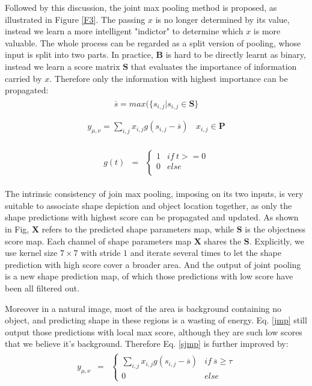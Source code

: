 \documentclass[10pt,twocolumn,letterpaper]{article}
\begin{document}
Followed by this discussion, the joint max pooling method is proposed, as illustrated in Figure \ref{F3}.
The passing $x$ is no longer determined by its value, instead we learn a more intelligent "indictor" to determine which $x$ is more valuable.
The whole process can be regarded as a split version of pooling, whose input is split into two parts.
In practice, $\mathbf{B}$ is hard to be directly learnt as binary, instead we learn a score matrix $\mathbf{S}$ that evaluates the importance of information carried by $x$.
Therefore only the information with highest importance can be propagated:
\begin{eqnarray}\label{max}
\begin{aligned}
\overline{s} = max(\{s_{i,j}|s_{i,j}\in \mathbf{S}\}\\
\end{aligned}
\end{eqnarray}
\begin{eqnarray}\label{sjmp}
\begin{aligned}
y_{\mu,\nu} = \sum_{i,j}x_{i,j}g(s_{i,j}-\overline{s})~~~~x_{i,j}\in \mathbf{P}
\end{aligned}
\end{eqnarray}

\begin{eqnarray}\label{sign}
\begin{aligned}
g(t)&=&\left\{\begin{array}{cc}
1&if~t>=0\\
0&else\\
\end{array}\right.
\end{aligned}
\end{eqnarray}

The intrinsic consistency of join max pooling, imposing on its two inputs, is very suitable to associate shape depiction and object location together, as only the shape predictions with highest score can be propagated and updated.
As shown in Fig, $\mathbf{X}$ refers to the predicted shape parameters map, while $\mathbf{S}$ is the objectness score map.
Each channel of shape parameters map $\mathbf{X}$ shares the $\mathbf{S}$.
Explicitly, we use kernel size $7\times 7$ with stride $1$ and iterate several times to let the shape prediction with high score cover a broader area.
And the output of joint pooling is a new shape prediction map, of which those predictions with low score have been all filtered out.

Moreover in a natural image, most of the area is background containing no object, and predicting shape in these regions is a wasting of energy.
Eq. \ref{jmp} still output those predictions with local max score, although they are such low scores that we believe it's background.
Therefore Eq. \ref{sjmp} is further improved by:
\begin{eqnarray}\label{fjmp}
\begin{aligned}
y_{\mu,\nu}&=&\left\{\begin{array}{cc}
\sum_{i,j}x_{i,j}g(s_{i,j}-\overline{s})& if~\overline{s}\geq\tau\\
0& else
\end{array}\right.
\end{aligned}
\end{eqnarray}
\end{document}
